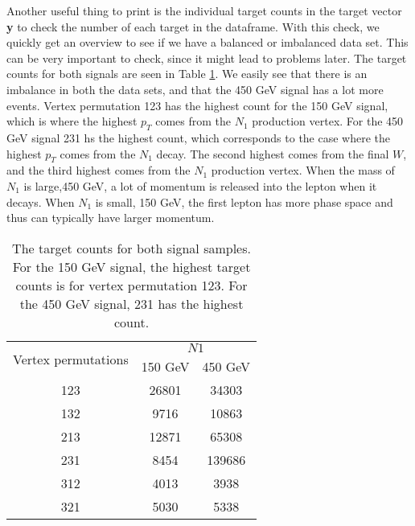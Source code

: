 \documentclass[a4paper, american, 12pt]{report}
\begin{document}
	Another useful thing to print is the individual target counts in the target vector \textbf{y} to check the number of each target in the dataframe. With this check, we quickly get an overview to see if we have a balanced or imbalanced data set. This can be very important to check, since it might lead to problems later. The target counts for both signals are seen in Table \ref{tab:Counts_original}. We easily see that there is an imbalance in both the data sets, and that the 450 GeV signal has a lot more events. Vertex permutation 123 has the highest count for the 150 GeV signal, which is where the highest $p_T$ comes from the $N_1$ production vertex. For the 450 GeV signal 231 hs the highest count, which corresponds to the case where the highest $p_T$ comes from the $N_1$ decay. The second highest comes from the final $W$, and the third highest comes from the $N_1$ production vertex. When the mass of $N_1$ is large,450 GeV, a lot of momentum is released into the lepton when it decays. When $N_1$ is small, 150 GeV, the first lepton has more phase space and thus can typically have larger momentum.
	\begin{table}[htbp!]
		\centering
		\begin{tabular}{ |c|c|c| }
			\hline
			\multirow{2}{*}{Vertex permutations} & \multicolumn{2}{|c|}{$N1$}\\
			\cline{2-3} \rule{0pt}{13pt}
			 & 150 GeV & 450 GeV  \\
			\hline \rule{0pt}{13pt}
			123 & 26801 & 34303 \\
			\hline \rule{0pt}{13pt}
			132 & 9716 & 10863 \\
			\hline \rule{0pt}{13pt}
			213 & 12871 & 65308 \\
			\hline \rule{0pt}{13pt}
			231 & 8454 & 139686 \\
			\hline \rule{0pt}{13pt}
			312 & 4013 & 3938 \\
			\hline \rule{0pt}{13pt}
			321 & 5030 & 5338 \\
			\hline
		\end{tabular}	
		\caption[Target counts of the classes.]{The target counts for both signal samples. For the 150 GeV signal, the highest target counts is for vertex permutation 123. For the 450 GeV signal, 231 has the highest count.}
		\label{tab:Counts_original}
	\end{table}
	
	
\end{document}
